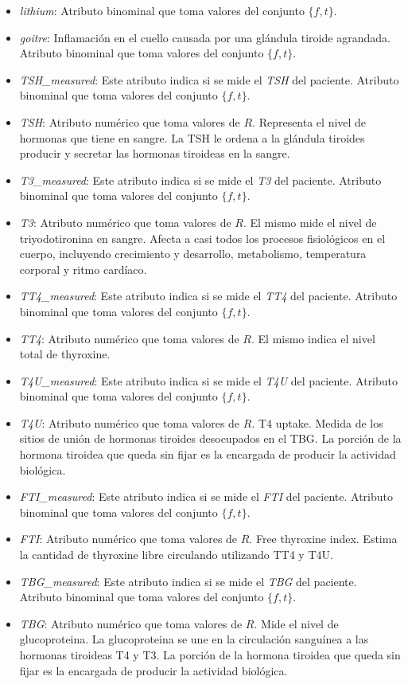 \documentclass[osajnl,twocolumn,showpacs,superscriptaddress,10pt,floatfix]{revtex4-1} %
\begin{document}
\begin{itemize}
    \item \textit{lithium}: Atributo binominal que toma valores del conjunto $\{f, t\}$.
    \item \textit{goitre}: Inflamación en el cuello causada por una glándula tiroide agrandada. Atributo binominal que toma valores del conjunto $\{f, t\}$.
    \item \textit{TSH\_measured}: Este atributo indica si se mide el \textit{TSH} del paciente. Atributo binominal que toma valores del conjunto $\{f, t\}$.
    \item \textit{TSH}: Atributo numérico que toma valores de $R$. Representa el nivel de hormonas que tiene en sangre. La TSH le ordena a la glándula tiroides producir y secretar las hormonas tiroideas en la sangre.
    \item \textit{T3\_measured}: Este atributo indica si se mide el \textit{T3} del paciente. Atributo binominal que toma valores del conjunto $\{f, t\}$.
    \item \textit{T3}: Atributo numérico que toma valores de $R$. El mismo mide el nivel de triyodotironina en sangre. Afecta a casi todos los procesos fisiológicos en el cuerpo, incluyendo crecimiento y desarrollo, metabolismo, temperatura corporal y ritmo cardíaco. 
    \item \textit{TT4\_measured}: Este atributo indica si se mide el \textit{TT4} del paciente. Atributo binominal que toma valores del conjunto $\{f, t\}$.
    \item \textit{TT4}: Atributo numérico que toma valores de $R$. El mismo indica el nivel total de thyroxine.
    \item \textit{T4U\_measured}: Este atributo indica si se mide el \textit{T4U} del paciente. Atributo binominal que toma valores del conjunto $\{f, t\}$.
    \item \textit{T4U}: Atributo numérico que toma valores de $R$. T4 uptake. Medida de los sitios de unión de hormonas tiroides desocupados en el TBG. La porción de la hormona tiroidea que queda sin fijar es la encargada de producir la actividad biológica.
    \item \textit{FTI\_measured}: Este atributo indica si se mide el \textit{FTI} del paciente. Atributo binominal que toma valores del conjunto $\{f, t\}$.
    \item \textit{FTI}: Atributo numérico que toma valores de $R$. Free thyroxine index. Estima la cantidad de thyroxine libre circulando utilizando TT4 y T4U.
    \item \textit{TBG\_measured}: Este atributo indica si se mide el \textit{TBG} del paciente. Atributo binominal que toma valores del conjunto $\{f, t\}$.
    \item \textit{TBG}: Atributo numérico que toma valores de $R$. Mide el nivel de glucoproteina. La glucoproteina se une en la circulación sanguínea a las hormonas tiroideas T4 y T3. La porción de la hormona tiroidea que queda sin fijar es la encargada de producir la actividad biológica. 
\end{itemize}
\end{document}
